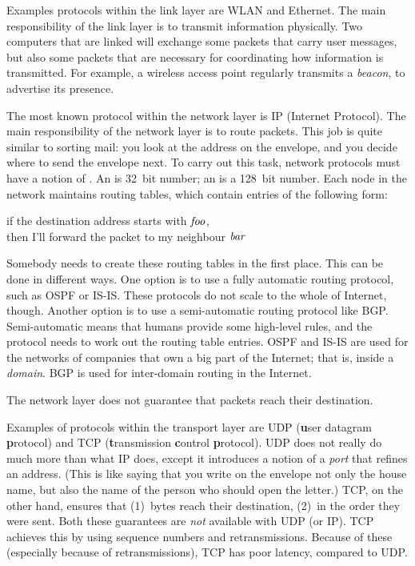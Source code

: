 Examples protocols within the link layer are WLAN and Ethernet.
The main responsibility of the link layer is to transmit information physically.
Two computers that are linked will exchange some packets that carry user messages,
  but also some packets that are necessary for coordinating how information
    is transmitted.
For example, a wireless access point regularly transmits a \emph{beacon},
  to advertise its presence.

The most known protocol within the network layer is IP (Internet Protocol).
The main responsibility of the network layer is to route packets.
This job is quite similar to sorting mail:
  you look at the address on the envelope,
    and you decide where to send the envelope next.
To carry out this task, network protocols must have a notion of .
An  is 32~bit number;
  an  is a 128~bit number.
Each node in the network maintains routing tables,
  which contain entries of the following form:
\begin{center}
if the destination address starts with $\it foo$,\\
  then I'll forward the packet to my neighbour $\it bar$
\end{center}
Somebody needs to create these routing tables in the first place.
This can be done in different ways.
One option is to use a fully automatic routing protocol,
  such as OSPF or IS-IS\null.
These protocols do not scale to the whole of Internet, though.
Another option is to use a semi-automatic routing protocol like BGP\null.
Semi-automatic means that humans provide some high-level rules,
  and the protocol needs to work out the routing table entries.
OSPF and IS-IS are used for the networks
  of companies that own a big part of the Internet;
  that is, inside a \emph{domain}.
BGP is used for inter-domain routing in the Internet.

The network layer does not guarantee that packets reach their destination.

Examples of protocols within the transport layer are
  UDP ({\bf u}ser {\sf d}atagram {\bf p}rotocol) and
  TCP ({\bf t}ransmission {\bf c}ontrol {\bf p}rotocol).
UDP does not really do much more than what IP does,
  except it introduces a notion of a \emph{port} that refines an address.
(This is like saying that you write on the envelope not only the house name,
  but also the name of the person who should open the letter.)
TCP, on the other hand, ensures that
  (1)~bytes reach their destination,
  (2)~in the order they were sent.
Both these guarantees are \emph{not} available with UDP (or IP).
TCP achieves this by using sequence numbers and retransmissions.
Because of these (especially because of retransmissions),
  TCP has poor latency, compared to UDP.

